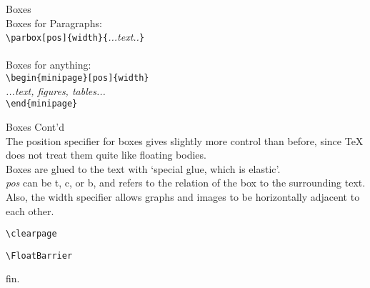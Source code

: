 \documentclass[landscape]{slides}
\begin{document}
\begin{normalsize}
\begin{slide}
{\Huge Boxes}
\vspace{1cm}\\
Boxes for Paragraphs:\\
\verb+\parbox[pos]{width}{+\emph{...text..}\verb+}+\\
\vspace{1cm}\\
Boxes for anything:\\
\verb+\begin{minipage}[pos]{width}+\\
\emph{...text, figures, tables...}\\
\verb+\end{minipage}+\\
\end{slide}
\begin{slide}
{\Huge Boxes Cont'd}
\vspace{1cm}\\
The position specifier for boxes gives slightly more control than before, since \TeX{} does not treat them quite like floating bodies.\\
Boxes are glued to the text with `special glue, which is elastic'.\\
\emph{pos} can be t, c, or b, and refers to the relation of the box to the surrounding text.\\
Also, the width specifier allows graphs and images to be horizontally adjacent to each other.\\
\end{slide}

\begin{slide}
\begin{center}
{\Huge \verb+\clearpage+}\\
\end{center}
\end{slide}


\begin{slide}
\begin{center}
{\Huge \verb+\FloatBarrier+}\\
\end{center}
\end{slide}

\begin{slide}
\begin{center}
fin.
\end{center}
\end{slide}

\end{normalsize}
\end{document}
